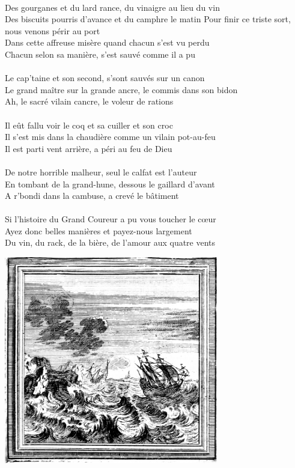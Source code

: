 \\Des gourganes et du lard rance, du vinaigre au lieu du vin
\\Des biscuits pourris d'avance et du camphre le matin
\breakpage
Pour finir ce triste sort, nous venons périr au port
\\Dans cette affreuse misère quand chacun s'est vu perdu
\\Chacun selon sa manière, s'est sauvé comme il a pu
\\\\Le cap'taine et son second, s'sont sauvés sur un canon
\\Le grand maître sur la grande ancre, le commis dans son bidon
\\Ah, le sacré vilain cancre, le voleur de rations
\\\\Il eût fallu voir le coq et sa cuiller et son croc
\\Il s'est mis dans la chaudière comme un vilain pot-au-feu
\\Il est parti vent arrière, a péri au feu de Dieu
\\\\De notre horrible malheur, seul le calfat est l'auteur
\\En tombant de la grand-hune, dessous le gaillard d'avant
\\A r'bondi dans la cambuse, a crevé le bâtiment
\\\\Si l'histoire du Grand Coureur a pu vous toucher le cœur
\\Ayez donc belles manières et payez-nous largement
\\Du vin, du rack, de la bière, de l'amour aux quatre vents
\bigskip
\begin{center}
\includegraphics[width=0.7\textwidth]{images/brev11.png}
\end{center}

\breakpage